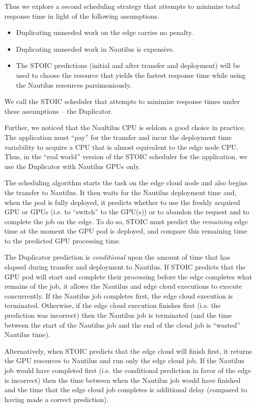 Thus we explore a second scheduling strategy that attempts to minimize total
response time in light of the following assumptions.
\begin{itemize}
\item Duplicating unneeded work on the edge carries no penalty.
\item Duplicating unneeded work in Nautilus is expensive.
\item The STOIC predictions (initial and after transfer and deployment) will be used to
choose the resource that yields the fastest response time while using the
Nautilus resources parsimoniously.
\end{itemize}
We call the STOIC scheduler that attempts to minimize response times under these assumptions -- the Duplicator.

Further, we noticed that the Naultilus CPU is seldom a good choice in
practice. The application must ``pay'' for the transfer and incur the
deployment time variability to acquire a CPU that is almost equivalent to the
edge node CPU.  Thus, in the ``real world'' version of the STOIC scheduler for
the application, we use the Duplicator with Nautilus GPUs only.

The scheduling algorithm starts the task on the edge cloud node and also
begins the transfer to Nautilus. It then waits for the Nautilus deployment
time and, when the pod is fully deployed, it predicts whether to use the
freshly acquired GPU or GPUs (i.e. to ``switch'' to the GPU(s)) or to abandon
the request and to complete the job on the edge.  To do so, STOIC must predict
the \textit{remaining} edge time at the moment the GPU pod is deployed, and
compare this remaining time to the predicted GPU processing time.  

The Duplicator prediction is \textit{conditional} upon the amount of time that
has elapsed during transfer and deployment to Nautilus. If STOIC predicts that
the GPU pod will start and complete their processing before the edge completes
what remains of the job, it allows the Nautilus and edge cloud executions to
execute concurrently. If the Nautilus job completes first, the edge cloud
execution is terminated.  Otherwise, if the edge cloud execution finishes
first (i.e. the prediction was incorrect) then the Nautilus job is terminated
(and the time between the start of the Nautilus job and the end of the cloud
job is ``wasted'' Nautilus time).

Alternatively, when STOIC predicts that the edge cloud will finish first, it
returns the GPU resources to Nautilus and run only the edge cloud job. If the
Nautilus job would have completed first (i.e. the conditional prediction in
favor of the edge is incorrect) then the time between when the Nautilus job
would have finished and the time that the edge cloud job completes is
additional delay (compared to having made a correct prediction).

